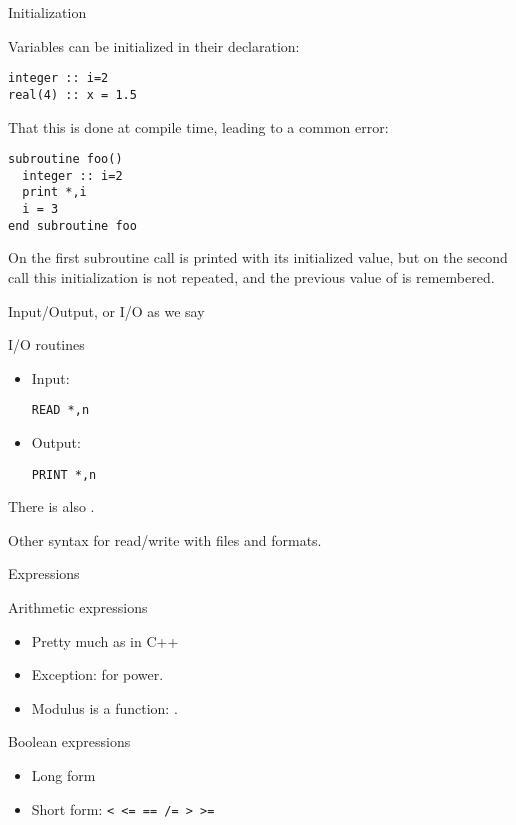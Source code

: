  {Initialization}

Variables can be initialized in their declaration:
\begin{verbatim}
integer :: i=2
real(4) :: x = 1.5
\end{verbatim}

That this is done at compile time, leading to a common error:
\begin{verbatim}
subroutine foo()
  integer :: i=2
  print *,i
  i = 3
end subroutine foo
\end{verbatim}
On the first subroutine call  is printed with its initialized
value, but on the second call this initialization is not repeated, and
the previous value of  is remembered.

 {Input/Output, or I/O as we say}
\label{sec:fio}

\begin{block}{I/O routines}
  \label{sl:frw}
  \begin{itemize}
  \item Input: 
\begin{verbatim}
READ *,n
\end{verbatim}
\item Output:
\begin{verbatim}
PRINT *,n
\end{verbatim}
  \end{itemize}
  There is also .

  Other syntax for read/write with files and formats.
\end{block}

 {Expressions}
\label{sec:fexpr}

\begin{block}{Arithmetic expressions}
  \label{sl:farith}
  \begin{itemize}
  \item Pretty much as in C++
  \item Exception:  for power.
  \item Modulus is a function: .
  \end{itemize}
\end{block}

\begin{block}{Boolean expressions}
  \label{sl:fbool}
  \begin{itemize}
  \item 
    Long form
  \item Short form:
    \verb+< <= == /= > >=+
  \end{itemize}
\end{block}

